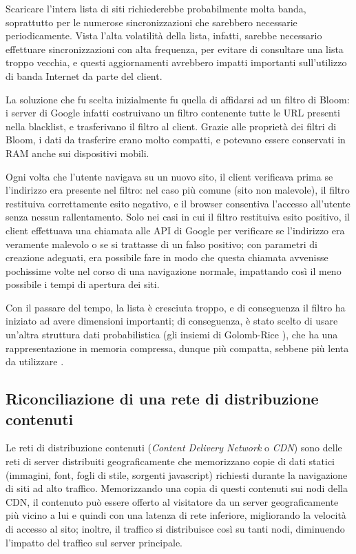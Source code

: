 Scaricare l'intera lista di siti richiederebbe probabilmente molta banda, soprattutto per le
numerose sincronizzazioni che sarebbero necessarie periodicamente. Vista l'alta volatilità della
lista, infatti, sarebbe necessario effettuare sincronizzazioni con alta frequenza, per evitare di
consultare una lista troppo vecchia, e questi aggiornamenti avrebbero impatti importanti
sull'utilizzo di banda Internet da parte del client.

La soluzione che fu scelta inizialmente fu quella di affidarsi ad un filtro di Bloom: i server
di Google infatti costruivano un filtro contenente tutte le URL presenti nella blacklist, e
trasferivano il filtro al client. Grazie alle proprietà dei filtri di Bloom, i dati da trasferire
erano molto compatti, e potevano essere conservati in RAM anche sui dispositivi mobili.

Ogni volta che l'utente navigava su un nuovo sito, il client verificava prima se l'indirizzo era
presente nel filtro: nel caso più comune (sito non malevole), il filtro restituiva correttamente
esito negativo, e il browser consentiva l'accesso all'utente senza nessun rallentamento. Solo nei
casi in cui il filtro restituiva esito positivo, il client effettuava una chiamata alle API di
Google per verificare se l'indirizzo era veramente malevolo o se si trattasse di un falso positivo;
con parametri di creazione adeguati, era possibile fare in modo che questa chiamata avvenisse
pochissime volte nel corso di una navigazione normale, impattando così il meno possibile i tempi
di apertura dei siti.

Con il passare del tempo, la lista è cresciuta troppo, e di conseguenza il filtro ha iniziato ad
avere dimensioni importanti; di conseguenza, è stato scelto di usare un'altra struttura dati
probabilistica (gli insiemi di Golomb-Rice \cite{golomb,rice,golomb-rice}), che ha una
rappresentazione in memoria compressa, dunque più compatta, sebbene più lenta da utilizzare
\cite{golomb-safebrowsing}.

\subsection{Riconciliazione di una rete di distribuzione con\-te\-nu\-ti}
\label{sec:bloomcdn}

Le reti di distribuzione contenuti (\emph{Content Delivery Network} o \emph{CDN}) sono delle reti
di server distribuiti geograficamente che memorizzano copie di dati statici (immagini, font, 
fogli di stile, sorgenti javascript) richiesti durante la navigazione di siti ad alto traffico. 
Memorizzando una copia di questi contenuti sui nodi della CDN, il contenuto può essere offerto
al visitatore da un server geograficamente più vicino a lui e quindi con una latenza di rete
inferiore, migliorando la velocità di accesso al sito; inoltre, il traffico si distribuisce
così su tanti nodi, diminuendo l'impatto del traffico sul server principale.

